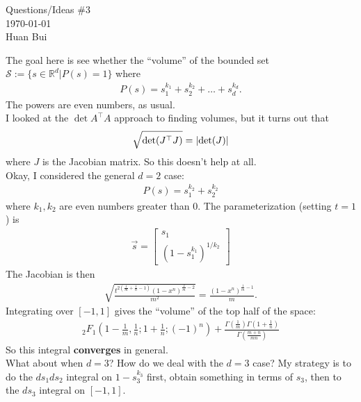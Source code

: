\documentclass{article}
\theoremstyle{definition}
\newcommand{\lp}{\left(}
\newcommand{\rp}{\right)}
\begin{document}
\begin{center}
	\huge{Questions/Ideas \#3}\\
	$\,$\\
	\normalsize{\today}\\
	\normalsize{Huan Bui}
\end{center}


The goal here is see whether the ``volume'' of the bounded set $\mathcal{S} := \{ s \in \mathbb{R}^d \vert P(s) = 1 \}$ where
\begin{align}
P(s) = s_1^{k_1} + s_2^{k_2} + \dots + s_d^{k_d}.
\end{align}
The powers are even numbers, as usual. \\

I looked at the $\det{A^\top A}$ approach to finding volumes, but it turns out that
\begin{align}
\sqrt{\det(J^\top J)} = \abs{\det(J)}
\end{align}
where $J$ is the Jacobian matrix. So this doesn't help at all. \\

Okay, I considered the general $d=2$ case:
\begin{align}
P(s) = s_1^{k_2} + s_2^{k_2}
\end{align}
where $k_1,k_2$ are even numbers greater than 0. The parameterization (setting $t=1$) is 
\begin{align}
\vec{s} = \begin{bmatrix}
s_1 \\ \lp 1-s_1^{k_1} \rp^{1/k_2}
\end{bmatrix}
\end{align}
The Jacobian is then
\begin{align}
\sqrt{\frac{t^{2 \left(\frac{1}{m}+\frac{1}{n}-1\right)}
		\left(1-x^n\right)^{\frac{2}{m}-2}}{m^2}} = {\frac{
		\left(1-x^n\right)^{\frac{1}{m}-1}}{m}}.
\end{align}
Integrating over $[-1,1]$ gives the ``volume'' of the top half of the space:
\begin{align}
_2F_1\left(1-\frac{1}{ m},\frac{1}{ n};1+\frac{1}{
	n};(-1)^{n}\right)+\frac{\Gamma \left(\frac{1}{ m}\right) \Gamma \left(1+\frac{1}{
		n}\right)}{\Gamma \left(\frac{m+n}{ m n}\right)}
\end{align}
So this integral \textbf{converges} in general. \\

What about when $d=3$? How do we deal with the $d=3$ case? My strategy is to do the $ds_1ds_2$ integral on $1 - s_3^{k_3}$ first, obtain something in terms of $s_3$, then to the $ds_3$ integral on $[-1,1]$. \\
\end{document}

